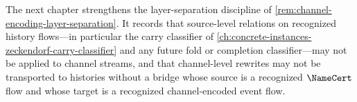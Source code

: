 \begin{remark}[Outlook]
\label{rem:channel-encoding-outlook}
The next chapter strengthens the layer-separation discipline of \autoref{rem:channel-encoding-layer-separation}. It records that source-level relations on recognized history flows---in particular the carry classifier of \autoref{ch:concrete-instances-zeckendorf-carry-classifier} and any future fold or completion classifier---may not be applied to channel streams, and that channel-level rewrites may not be transported to histories without a bridge whose source is a recognized $\NameCert$ flow and whose target is a recognized channel-encoded event flow.
\end{remark}
